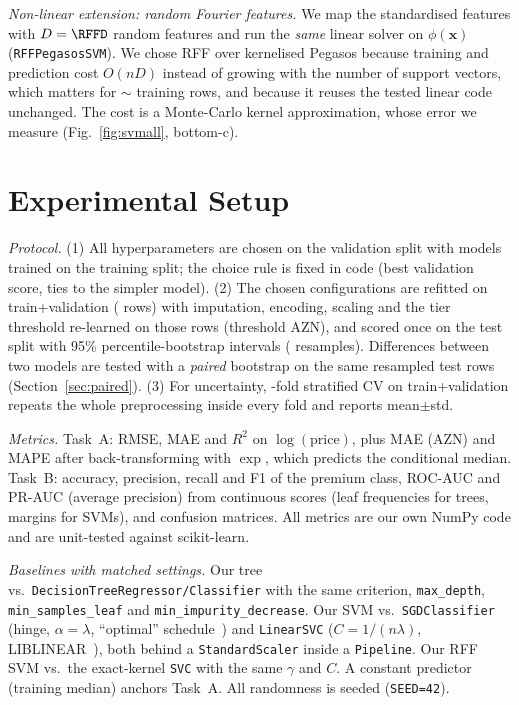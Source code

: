 \documentclass[10pt,twocolumn,a4paper]{article}
\newcommand{\vect}[1]{\mathbf{#1}}
\begin{document}
\emph{Non-linear extension: random Fourier features.} We map the
standardised features with $D=\RFFD$ random features and run the
\emph{same} linear solver on $\phi(\vect x)$ (\texttt{RFFPegasosSVM}). We
chose RFF over kernelised Pegasos because training and prediction cost
$O(nD)$ instead of growing with the number of support vectors, which
matters for $\sim$\NDev{} training rows, and because it reuses the tested
linear code unchanged. The cost is a Monte-Carlo kernel approximation,
whose error we measure (Fig.~\ref{fig:svmall}, bottom-c).

\section{Experimental Setup}
\emph{Protocol.} (1) All hyperparameters are chosen on the validation
split with models trained on the training split; the choice rule is fixed
in code (best validation score, ties to the simpler model).
(2) The chosen configurations are refitted on train+validation
(\NDev{} rows) with imputation, encoding, scaling and the tier threshold
re-learned on those rows (threshold \TierThresholdDev{} AZN), and scored
once on the test split with 95\% percentile-bootstrap intervals (\NBoot{}
resamples). Differences between two models are tested with a \emph{paired}
bootstrap on the same resampled test rows (Section~\ref{sec:paired}). (3) For uncertainty, \CVFolds-fold stratified CV on
train+validation repeats the whole preprocessing inside every fold and
reports mean$\pm$std.

\emph{Metrics.} Task~A: RMSE, MAE and $R^2$ on $\log(\text{price})$, plus
MAE (AZN) and MAPE after back-transforming with $\exp$, which predicts the
conditional median. Task~B: accuracy, precision, recall and F1 of the
premium class, ROC-AUC and PR-AUC (average precision) from continuous
scores (leaf frequencies for trees, margins for SVMs), and confusion
matrices. All metrics are our own NumPy code and are unit-tested against
scikit-learn.

\emph{Baselines with matched settings.} Our tree vs.\
\texttt{DecisionTreeRegressor/Classifier} with the same criterion,
\texttt{max\_depth}, \texttt{min\_samples\_leaf} and
\texttt{min\_impurity\_decrease}. Our SVM vs.\ \texttt{SGDClassifier}
(hinge, $\alpha=\lambda$, ``optimal'' schedule~\cite{bottou}) and
\texttt{LinearSVC} ($C=1/(n\lambda)$, LIBLINEAR~\cite{liblinear}), both
behind a \texttt{StandardScaler} inside a \texttt{Pipeline}. Our RFF SVM
vs.\ the exact-kernel \texttt{SVC} with the same $\gamma$ and $C$. A
constant predictor (training median) anchors Task~A. All randomness is
seeded (\texttt{SEED=42}).
\end{document}

